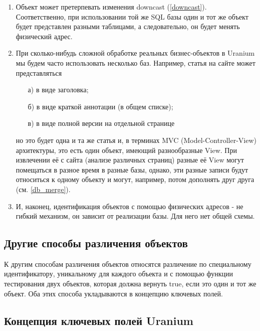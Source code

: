 \documentclass[a4paper]{book}
\def\ur{Uranium}
\begin{document}
\begin{enumerate}

\item Объект может претерпевать изменения downcast
  (\ref{downcast}). Соответственно, при использовании той же SQL
  базы один и тот же объект будет представлен разными таблицами,
  а следовательно, он будет менять физический адрес.

\item При сколько-нибудь сложной обработке реальных
  бизнес-объектов в \ur{} мы будем часто использовать несколько
  баз. Например, статья на сайте может представляться
  \begin{itemize}
  \item[а)] в виде заголовка;
  \item[б)] в виде краткой аннотации (в общем списке);
  \item[в)] в виде полной версии на отдельной странице
  \end{itemize}

  но это будет одна и та же статья и, в терминах MVC
  (Model-Controller-View) архитектуры, это есть один объект,
  имеющий разнообразные View. При извлечении её с сайта (анализе
  различных страниц) разные её View могут помещаться в разное
  время в разные базы, однако, эти разные записи будут относиться
  к одному объекту и могут, например, потом дополнять друг друга
  (см. \ref{db_merge}).

\item И, наконец, идентификация объектов с помощью физических
  адресов - не гибкий механизм, он зависит от реализации
  базы. Для него нет общей схемы.

\end{enumerate}


\subsection{Другие способы различения объектов}

К другим способам различения объектов относятся различение по
специальному идентификатору, уникальному для каждого объекта и с
помощью функции тестирования двух объектов, которая должна
вернуть true, если это один и тот же объект. Оба этих способа
укладываются в концепцию ключевых полей.


\subsection{Концепция ключевых полей \ur}
\end{document}
